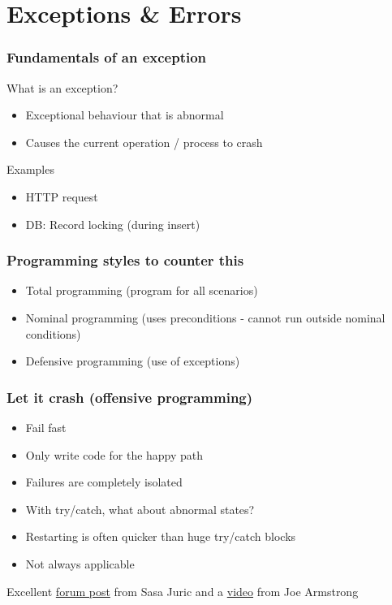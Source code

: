 

\section{Exceptions \& Errors}

\frame{\tableofcontents[currentsection]}

\begin{frame}
    \frametitle{Fundamentals of an exception}
    What is an exception?
    \begin{itemize}
        \item Exceptional behaviour that is abnormal
        \item Causes the current operation / process to crash
    \end{itemize}

    \vfill

    Examples
    \begin{itemize}
        \item HTTP request
        \item DB: Record locking (during insert)
    \end{itemize}
\end{frame}

\begin{frame}
    \frametitle{Programming styles to counter this}
    \begin{itemize}
        \item Total programming (program for all scenarios)
        \item Nominal programming (uses preconditions - cannot run outside nominal conditions)
        \item Defensive programming (use of exceptions)
    \end{itemize}
\end{frame}

\begin{frame}
    \frametitle{Let it crash (offensive programming)}
    \begin{itemize}
        \item Fail fast
        \item Only write code for the happy path
        \item Failures are completely isolated
        \item With try/catch, what about abnormal states?
        \item Restarting is often quicker than huge try/catch blocks
        \item Not always applicable
    \end{itemize}

    \vfill

    \tiny
    Excellent
    \href{https://elixirforum.com/t/understanding-the-advantages-of-let-it-crash-term/9748/19?u=wfransen}{forum post}
    from Sasa Juric and a
    \href{https://elixirforum.com/t/understanding-the-advantages-of-let-it-crash-term/9748/21?u=wfransen}{video}
    from Joe Armstrong
\end{frame}
